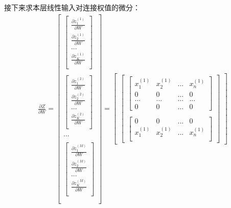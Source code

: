 \documentclass[UTF8]{article}
\begin{document}
接下来求本层线性输入对连接权值的微分：
\begin{equation}
\begin{aligned}
\frac{\partial{ Z }}{\partial{ W }}=\begin{bmatrix}
\begin{bmatrix}
 \frac{\partial{z_{1}^{(1)}}}{\partial{W}} \\
 \frac{\partial{z_{2}^{(1)}}}{\partial{W}} \\
 ... \\
 \frac{\partial{z_{K}^{(1)}}}{\partial{W}} \\
 \end{bmatrix} \\ \\
\begin{bmatrix}
 \frac{\partial{z_{1}^{(2)}}}{\partial{W}} \\
 \frac{\partial{z_{2}^{(2)}}}{\partial{W}} \\
 ... \\
 \frac{\partial{z_{K}^{(2)}}}{\partial{W}} \\
 \end{bmatrix} \\ \\
 ... \\ \\
 \begin{bmatrix}
 \frac{\partial{z_{1}^{(M)}}}{\partial{W}} \\
 \frac{\partial{z_{2}^{(M)}}}{\partial{W}} \\
 ... \\
 \frac{\partial{z_{K}^{(M)}}}{\partial{W}} \\
 \end{bmatrix} \\ \\
\end{bmatrix}
=\begin{bmatrix}
\begin{bmatrix}
 \begin{bmatrix}
 x_{1}^{(1)} & x_{2}^{(1)} & ... & x_{n}^{(1)} \\
 0 & 0 & ... &　0 \\
 ... & ... & ... & ... \\
 0 & 0 & ... & 0
 \end{bmatrix} \\ \\
 \begin{bmatrix}
 0 & 0 & ... & 0 \\
 x_{1}^{(1)} & x_{2}^{(1)} & ... & x_{n}^{(1)} \\

\end{bmatrix}
\end{bmatrix}
\end{bmatrix}
\end{aligned}
\end{equation}
\end{document}
